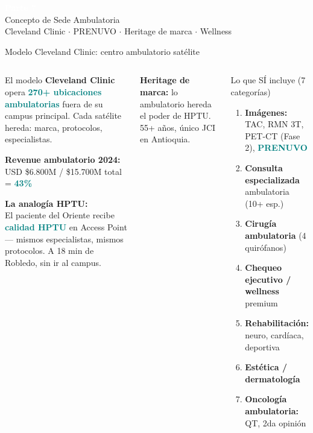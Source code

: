 \documentclass[aspectratio=169, 11pt]{beamer}
\newcommand{\highlight}[1]{\textcolor{teal}{\textbf{#1}}}
\begin{document}
{
\begin{frame}[plain]
\vfill
\begin{center}
{\Huge\bfseries\textcolor{white}{Parte 7}}\\[8pt]
{\Large\textcolor{white!85}{Concepto de Sede Ambulatoria}}\\[12pt]
{\normalsize\textcolor{white!60}{Cleveland Clinic $\cdot$ PRENUVO $\cdot$ Heritage de marca $\cdot$ Wellness}}
\end{center}
\vfill
\end{frame}
}

{
\begin{frame}{Modelo Cleveland Clinic: centro ambulatorio satélite}
\begin{columns}[T]
\begin{block}{\small El modelo}
\scriptsize
\textbf{Cleveland Clinic} opera \highlight{270+ ubicaciones ambulatorias} fuera de su campus principal. Cada satélite hereda: marca, protocolos, especialistas.

\vspace{2pt}
\textbf{Revenue ambulatorio 2024:} USD \$6.800M / \$15.700M total = \highlight{43\%}

\vspace{3pt}
\textbf{La analogía HPTU:}\\
El paciente del Oriente recibe \highlight{calidad HPTU} en Access Point --- mismos especialistas, mismos protocolos. A 18 min de Robledo, sin ir al campus.
\end{block}

\vspace{1pt}
{\scriptsize\textbf{Heritage de marca:} lo ambulatorio hereda el poder de HPTU. 55+ años, único JCI en Antioquia.}

\begin{exampleblock}{\small Lo que SÍ incluye (7 categorías)}
\scriptsize
\begin{enumerate}\setlength{\itemsep}{0pt}
  \item \textbf{Imágenes:} TAC, RMN 3T, PET-CT (Fase 2), \highlight{PRENUVO}
  \item \textbf{Consulta especializada} ambulatoria (10+ esp.)
  \item \textbf{Cirugía ambulatoria} (4 quirófanos)
  \item \textbf{Chequeo ejecutivo / wellness} premium
  \item \textbf{Rehabilitación:} neuro, cardíaca, deportiva
  \item \textbf{Estética / dermatología}
  \item \textbf{Oncología ambulatoria:} QT, 2da opinión
\end{enumerate}
\end{exampleblock}


\end{columns}
\end{frame}}
\end{document}
